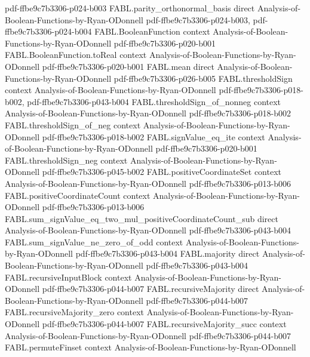 \begin{theorem}
{    pdf-ffbe9c7b3306-p024-b003}
\proofstep
  {FABL.parity_orthonormal_basis}
  {direct}
  {Analysis-of-Boolean-Functions-by-Ryan-ODonnell}
  {pdf-ffbe9c7b3306-p024-b003,
    pdf-ffbe9c7b3306-p024-b004}
\proofstep
  {FABL.BooleanFunction}
  {context}
  {Analysis-of-Boolean-Functions-by-Ryan-ODonnell}
  {pdf-ffbe9c7b3306-p020-b001}
\proofstep
  {FABL.BooleanFunction.toReal}
  {context}
  {Analysis-of-Boolean-Functions-by-Ryan-ODonnell}
  {pdf-ffbe9c7b3306-p020-b001}
\proofstep
  {FABL.mean}
  {direct}
  {Analysis-of-Boolean-Functions-by-Ryan-ODonnell}
  {pdf-ffbe9c7b3306-p026-b005}
\proofstep
  {FABL.thresholdSign}
  {context}
  {Analysis-of-Boolean-Functions-by-Ryan-ODonnell}
  {pdf-ffbe9c7b3306-p018-b002,
    pdf-ffbe9c7b3306-p043-b004}
\proofstep
  {FABL.thresholdSign_of_nonneg}
  {context}
  {Analysis-of-Boolean-Functions-by-Ryan-ODonnell}
  {pdf-ffbe9c7b3306-p018-b002}
\proofstep
  {FABL.thresholdSign_of_neg}
  {context}
  {Analysis-of-Boolean-Functions-by-Ryan-ODonnell}
  {pdf-ffbe9c7b3306-p018-b002}
\proofstep
  {FABL.signValue_eq_ite}
  {context}
  {Analysis-of-Boolean-Functions-by-Ryan-ODonnell}
  {pdf-ffbe9c7b3306-p020-b001}
\proofstep
  {FABL.thresholdSign_neg}
  {context}
  {Analysis-of-Boolean-Functions-by-Ryan-ODonnell}
  {pdf-ffbe9c7b3306-p045-b002}
\proofstep
  {FABL.positiveCoordinateSet}
  {context}
  {Analysis-of-Boolean-Functions-by-Ryan-ODonnell}
  {pdf-ffbe9c7b3306-p013-b006}
\proofstep
  {FABL.positiveCoordinateCount}
  {context}
  {Analysis-of-Boolean-Functions-by-Ryan-ODonnell}
  {pdf-ffbe9c7b3306-p013-b006}
\proofstep
  {FABL.sum_signValue_eq_two_mul_positiveCoordinateCount_sub}
  {direct}
  {Analysis-of-Boolean-Functions-by-Ryan-ODonnell}
  {pdf-ffbe9c7b3306-p043-b004}
\proofstep
  {FABL.sum_signValue_ne_zero_of_odd}
  {context}
  {Analysis-of-Boolean-Functions-by-Ryan-ODonnell}
  {pdf-ffbe9c7b3306-p043-b004}
\proofstep
  {FABL.majority}
  {direct}
  {Analysis-of-Boolean-Functions-by-Ryan-ODonnell}
  {pdf-ffbe9c7b3306-p043-b004}
\proofstep
  {FABL.recursiveInputBlock}
  {context}
  {Analysis-of-Boolean-Functions-by-Ryan-ODonnell}
  {pdf-ffbe9c7b3306-p044-b007}
\proofstep
  {FABL.recursiveMajority}
  {direct}
  {Analysis-of-Boolean-Functions-by-Ryan-ODonnell}
  {pdf-ffbe9c7b3306-p044-b007}
\proofstep
  {FABL.recursiveMajority_zero}
  {context}
  {Analysis-of-Boolean-Functions-by-Ryan-ODonnell}
  {pdf-ffbe9c7b3306-p044-b007}
\proofstep
  {FABL.recursiveMajority_succ}
  {context}
  {Analysis-of-Boolean-Functions-by-Ryan-ODonnell}
  {pdf-ffbe9c7b3306-p044-b007}
\proofstep
  {FABL.permuteFinset}
  {context}
  {Analysis-of-Boolean-Functions-by-Ryan-ODonnell}

\end{theorem}
